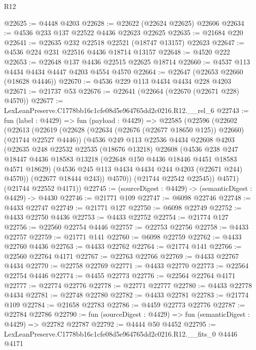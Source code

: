 \begin{lexlean}{R12}
\begin{coremodule}
@22625 := @4448 @4203
@22628 := @22622 (@22624 @22625) @22606
@22634 := @4536 @233 @137 @22522 @4436 @22623 @22625
@22635 := @21684 @220
@22641 := @22635 @232 @22518 @22521 (@18747 @13157) @22623
@22647 := @4536 @224 @231 @22516 @4436 @18714 @13157
@22648 := @4520 @222
@22653 := @22648 @137 @4436 @22515 @22625 @18714
@22660 := @4537 @113 @4434 @4434 @4447 @4203 @4554 @4570
@22664 := @22647 (@22653 @22660 (@18628 @4446))
@22670 := @4536 @229 @113 @4434 @4434 @228 @4203
@22671 := @21737 @53
@22676 := @22641 (@22664 (@22670 (@22671 @228) @4570))
@22677 := LexLeanPreserve.C1778bb16c1cfe08d5e964765dd2c0216.R12.__rel_6
@22743 := fun (label : @4429) =>
  fun (payload : @4429) =>
  @22585
    (@22596
      (@22602
        (@22613
          (@22619
            (@22628 (@22634 (@22676 (@22677 @18650 @125)) @22660) (@21744 @22527 @4446))
            (@4536
              @249
              @113
              @22536
              @4434
              @22608
              @4203
              (@22635
                @248
                @22532
                @22535
                (@18676 @13218)
                @22608
                (@4536
                  @238
                  @247
                  @18447
                  @4436
                  @18583
                  @13218
                  (@22648 @150 @4436 @18446 @4451 @18583 @4571 @18629)
                  (@4536 @245 @113 @4434 @4434 @244 @4203 (@22671 @244) @4570))
                (@22677 @18444 @243))
              @4570))
          (@21744 @22542 @22545))
        @4571)
      (@21744 @22552 @4171))
@22745 := (sourceDigest : @4429) -> (semanticDigest : @4429) -> @4430
@22746 := @21771 @109
@22747 := @6098 @22746
@22748 := @4433 @22747
@22749 := @21771 @127
@22750 := @6098 @22749
@22752 := @4433 @22750 @4436
@22753 := @4433 @22752
@22754 := @21774 @127
@22756 := @22560 @22754 @4446
@22757 := @22753 @22756
@22758 := @4433 @22757
@22759 := @21771 @141
@22760 := @6098 @22759
@22762 := @4433 @22760 @4436
@22763 := @4433 @22762
@22764 := @21774 @141
@22766 := @22560 @22764 @4171
@22767 := @22763 @22766
@22769 := @4433 @22767 @4434
@22770 := @22758 @22769
@22771 := @4433 @22770
@22773 := @22564 @22754 @4446
@22774 := @4455 @22773
@22776 := @22564 @22764 @4171
@22777 := @22774 @22776
@22778 := @22771 @22777
@22780 := @4433 @22778 @4434
@22781 := @22748 @22780
@22782 := @4433 @22781
@22783 := @21774 @109
@22784 := @21658 @22783
@22786 := @4459 @22773 @22776
@22787 := @22784 @22786
@22790 := fun (sourceDigest : @4429) => fun (semanticDigest : @4429) => @22782 @22787
@22792 := @4444 @50 @4452
@22795 := LexLeanPreserve.C1778bb16c1cfe08d5e964765dd2c0216.R12.__fits_0 @4446 @4171

\end{coremodule}
\end{lexlean}
